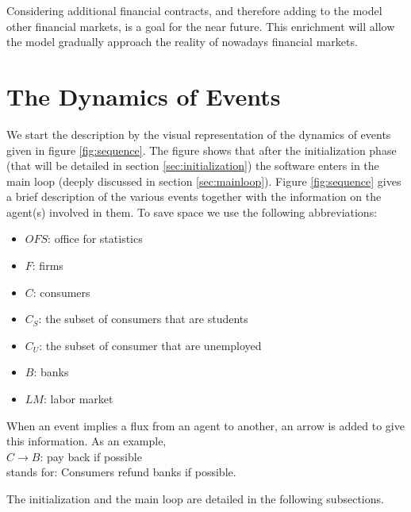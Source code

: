 \documentclass{book}
\begin{document}
Considering additional financial contracts, and therefore adding to the model other financial markets, is a goal for the near future. This enrichment will allow the model gradually approach the reality of nowadays financial markets.




\newpage
\chapter{The Dynamics of Events}\label{chap:events}

We start the description by the visual representation of the dynamics of events given in figure \ref{fig:sequence}. The figure shows that after the initialization phase (that will be detailed in section \ref{sec:initialization}) the software enters in the main loop (deeply discussed in section \ref{sec:mainloop}). Figure \ref{fig:sequence} gives a brief description of the various events together with the information on the agent(s) involved in them. To save space we use the following abbreviations:

\begin{itemize}
	\item $OFS$: office for statistics
	\item $F$: firms
	\item $C$: consumers
	\item $C_S$: the subset of consumers that are students
	\item $C_U$: the subset of consumer that are unemployed
	\item $B$: banks
	\item $LM$: labor market
\end{itemize}

When an event implies a flux from an agent to another, an arrow is added to give this information. As an example,\\
$C \rightarrow B$: pay back if possible\\
stands for: Consumers refund banks if possible.

The initialization and the main loop are detailed in the following subsections.
\end{document}
